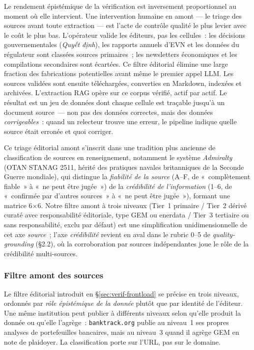 Le rendement épistémique de la vérification est inversement proportionnel au
moment où elle intervient. Une intervention humaine en amont --- le triage
des sources avant toute extraction --- est l'acte de contrôle qualité le plus
levier avec le coût le plus bas. L'opérateur valide les éditeurs, pas les
cellules~: les décisions gouvernementales (\emph{Quyết định}), les rapports
annuels d'EVN et les données du régulateur sont classées sources primaires~;
les newsletters économiques et les compilations secondaires sont écartées.
Ce filtre éditorial élimine une large fraction des fabrications potentielles
avant même le premier appel LLM. Les sources validées sont ensuite
téléchargées, converties en Markdown, indexées et archivées. L'extraction RAG
opère sur ce corpus vérifié, actif par actif. Le résultat est un jeu de
données dont chaque cellule est traçable jusqu'à un document source~--- non
pas des données correctes, mais des données \emph{corrigeables}~: quand un
relecteur trouve une erreur, le pipeline indique quelle source était erronée
et quoi corriger.

Ce triage éditorial amont s'inscrit dans une tradition plus ancienne de
classification de sources en renseignement, notamment le système
\emph{Admiralty} (OTAN STANAG 2511, hérité des pratiques navales
britanniques de la Seconde Guerre mondiale), qui distingue la
\emph{fiabilité de la source} (A--F, de «~complètement fiable~» à «~ne
peut être jugée~») de la \emph{crédibilité de l'information} (1--6, de
«~confirmée par d'autres sources~» à «~ne peut être jugée~»), formant
une matrice 6$\times$6. Notre filtre amont à trois niveaux (Tier~1
primaire \;/\; Tier~2 dérivé curaté avec responsabilité éditoriale,
type GEM ou enerdata \;/\; Tier~3 tertiaire ou sans responsabilité, exclu
par défaut) est une simplification unidimensionnelle de cet axe
\emph{source}~; l'axe \emph{crédibilité} revient en aval dans le rubric
0--5 de \emph{quality-grounding} (§2.2), où la corroboration par sources
indépendantes joue le rôle de la crédibilité multi-sources.

\subsubsection{Filtre amont des sources}\label{sec:verif-filter}

Le filtre éditorial introduit en §\ref{sec:verif-frontload} se précise en
trois niveaux, ordonnés par \emph{rôle épistémique de la donnée} plutôt
que par identité de l'éditeur. Une même institution peut publier à
différents niveaux selon qu'elle produit la donnée ou qu'elle l'agrège~:
\texttt{banktrack.org} publie au niveau~1 ses propres analyses de
portefeuilles bancaires, mais au niveau~3 quand il agrège GEM en note
de plaidoyer. La classification porte sur l'URL, pas sur le domaine.

